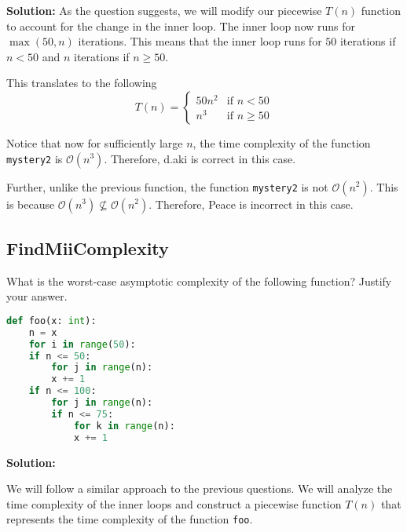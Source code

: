 \documentclass[12pt]{article}
\begin{document}
\textbf{Solution:}
As the question suggests, we will modify our piecewise $T(n)$ function to account for the change in the inner loop. The inner loop now runs for $\max(50, n)$ iterations. This means that the inner loop runs for $50$ iterations if $n < 50$ and $n$ iterations if $n \geq 50$.

This translates to the following
\begin{equation}
    T(n) = \begin{cases}
        50n^2 & \text{if } n < 50 \\
        n^3 & \text{if } n \geq 50
    \end{cases}
\end{equation}

Notice that now for sufficiently large $n$, the time complexity of the function \texttt{mystery2} is $\mathcal{O}(n^3)$. Therefore, d.aki is correct in this case.

Further, unlike the previous function, the function \texttt{mystery2} is not $\mathcal{O}(n^2)$. This is because $\mathcal{O}(n^3) \not\subseteq \mathcal{O}(n^2)$. Therefore, Peace is incorrect in this case.

\subsection{FindMiiComplexity}
What is the worst-case asymptotic complexity of the following function? Justify your answer.
\begin{lstlisting}[language=Python,style=mystyle]
def foo(x: int):
    n = x
    for i in range(50):
    if n <= 50:
        for j in range(n):
        x += 1
    if n <= 100:
        for j in range(n):
        if n <= 75:
            for k in range(n):
            x += 1
\end{lstlisting}

\textbf{Solution:}

We will follow a similar approach to the previous questions. We will analyze the time complexity of the inner loops and construct a piecewise function $T(n)$ that represents the time complexity of the function \texttt{foo}.
\end{document}
